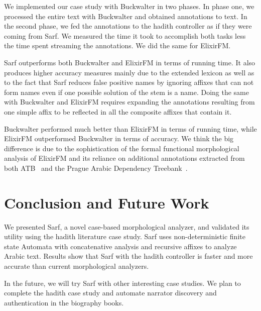 \documentclass[11pt]{article}
\begin{document}
We implemented our case study with Buckwalter in two phases. 
In phase one, we processed the entire text with Buckwalter and
obtained annotations to text. 
In the second phase, we fed the annotations to 
the hadith controller as if they were coming from Sarf. 
We measured the time it took to accomplish both tasks
less the time spent streaming the annotations.
We did the same for ElixirFM. 

Sarf outperforms both Buckwalter and ElixirFM in terms of 
running time. 
It also produces higher accuracy measures 
mainly due to the extended
lexicon as well as to the fact that Sarf reduces false positive
names by ignoring affixes that can not form
names even if one possible solution of the stem is a name. 
Doing the same with Buckwalter and ElixirFM requires  
expanding the annotations resulting from one simple affix to be 
reflected in all the composite affixes that contain it.

Buckwalter performed much better than ElixirFM in 
terms of running time, 
while ElixirFM outperformed Buckwalter in terms of accuracy.
We think the big difference is due to the sophistication of 
the formal functional morphological analysis of ElixirFM 
and its reliance on additional annotations extracted from 
both ATB~\cite{Maamouri:04} and the Prague Arabic Dependency Treebank~\cite{Prague04}.

\section{Conclusion and Future Work}
\label{sec:future}

We presented Sarf, a novel case-based morphological analyzer,
and validated its utility using the hadith literature
case study. 
Sarf uses non-deterministic finite state Automata with 
concatenative analysis and recursive affixes to analyze 
Arabic text. 
Results show that Sarf with the hadith controller
is faster and more accurate than
current morphological analyzers.

In the future, 
we will try Sarf with other interesting case studies.
We plan to complete the hadith case study 
and automate narrator discovery and authentication in the 
biography books. 
\end{document}
